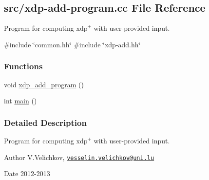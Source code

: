 \hypertarget{xdp-add-program_8cc}{\subsection{src/xdp-\/add-\/program.cc \-File \-Reference}
\label{xdp-add-program_8cc}
}


\-Program for computing $\mathrm{xdp}^{+}$ with user-\/provided input.  


{\ttfamily \#include \char`\"{}common.\-hh\char`\"{}}\*
{\ttfamily \#include \char`\"{}xdp-\/add.\-hh\char`\"{}}\*
\subsubsection*{\-Functions}
\begin{DoxyCompactItemize}
\item 
void \hyperlink{xdp-add-program_8cc_ae3d88a16277c0b4d98e2b01843a9a0df}{xdp\-\_\-add\-\_\-program} ()
\item 
int \hyperlink{xdp-add-program_8cc_ae66f6b31b5ad750f1fe042a706a4e3d4}{main} ()
\end{DoxyCompactItemize}


\subsubsection{\-Detailed \-Description}
\-Program for computing $\mathrm{xdp}^{+}$ with user-\/provided input. \begin{DoxyAuthor}{\-Author}
\-V.\-Velichkov, \href{mailto:vesselin.velichkov@uni.lu}{\tt vesselin.\-velichkov@uni.\-lu} 
\end{DoxyAuthor}
\begin{DoxyDate}{\-Date}
2012-\/2013 
\end{DoxyDate}



